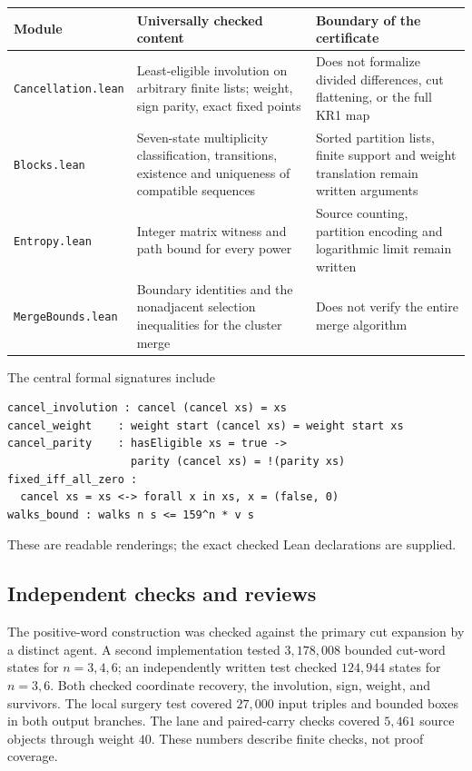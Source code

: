 \documentclass[11pt,a4paper]{article}
\theoremstyle{definition}
\begin{document}
\begin{center}
\begin{tabularx}{\linewidth}{lXX}
\toprule
Module&Universally checked content&Boundary of the certificate\\\midrule
\texttt{Cancellation.lean}&Least-eligible involution on arbitrary finite lists;
weight, sign parity, exact fixed points&Does not formalize divided differences,
cut flattening, or the full KR1 map\\
\texttt{Blocks.lean}&Seven-state multiplicity classification, transitions,
existence and uniqueness of compatible sequences&Sorted partition lists,
finite support and weight translation remain written arguments\\
\texttt{Entropy.lean}&Integer matrix witness and path bound for every power&
Source counting, partition encoding and logarithmic limit remain written\\
\texttt{MergeBounds.lean}&Boundary identities and the nonadjacent selection
inequalities for the cluster merge&Does not verify the entire merge algorithm\\\bottomrule
\end{tabularx}
\end{center}

The central formal signatures include
\begin{verbatim}
cancel_involution : cancel (cancel xs) = xs
cancel_weight    : weight start (cancel xs) = weight start xs
cancel_parity    : hasEligible xs = true ->
                   parity (cancel xs) = !(parity xs)
fixed_iff_all_zero :
  cancel xs = xs <-> forall x in xs, x = (false, 0)
walks_bound : walks n s <= 159^n * v s
\end{verbatim}
These are readable renderings; the exact checked Lean declarations are supplied.

\subsection{Independent checks and reviews}

The positive-word construction was checked against the primary cut expansion
by a distinct agent. A second implementation tested $3{,}178{,}008$ bounded
cut-word states for $n=3,4,6$; an independently written test checked
$124{,}944$ states for $n=3,6$. Both checked coordinate recovery, the
involution, sign, weight, and survivors. The local surgery test covered
$27{,}000$ input triples and bounded boxes in both output branches.
The lane and paired-carry checks covered $5{,}461$ source objects through
weight $40$. These numbers describe finite checks, not proof coverage.
\end{document}
